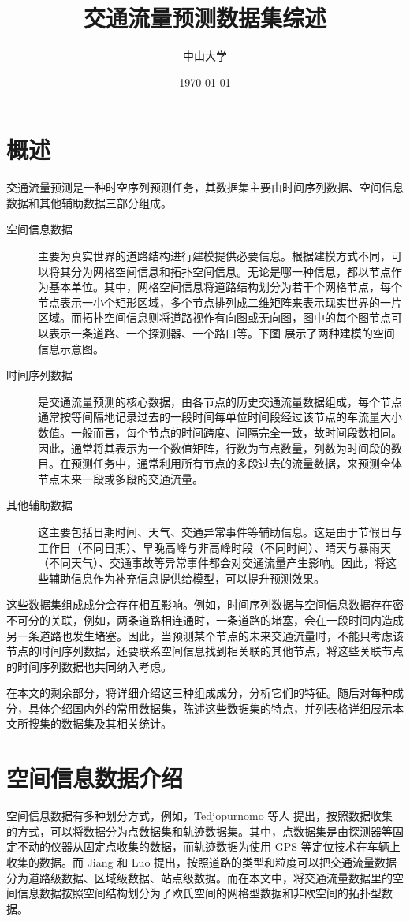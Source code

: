 \documentclass{ctexart}
\begin{document}
\title{交通流量预测数据集综述}
\author{中山大学}
\date{\today}
\maketitle
\tableofcontents
\section{概述}

交通流量预测是一种时空序列预测任务，其数据集主要由时间序列数据、空间信息数据和其他辅助数据三部分组成。

\begin{description}
    \item[空间信息数据] 主要为真实世界的道路结构进行建模提供必要信息。根据建模方式不同，可以将其分为网格空间信息和拓扑空间信息。无论是哪一种信息，都以节点作为基本单位。其中，网格空间信息将道路结构划分为若干个网格节点，每个节点表示一小个矩形区域，多个节点排列成二维矩阵来表示现实世界的一片区域。而拓扑空间信息则将道路视作有向图或无向图，图中的每个图节点可以表示一条道路、一个探测器、一个路口等。下图 展示了两种建模的空间信息示意图。
    \item[时间序列数据] 是交通流量预测的核心数据，由各节点的历史交通流量数据组成，每个节点通常按等间隔地记录过去的一段时间每单位时间段经过该节点的车流量大小数值。一般而言，每个节点的时间跨度、间隔完全一致，故时间段数相同。因此，通常将其表示为一个数值矩阵，行数为节点数量，列数为时间段的数目。在预测任务中，通常利用所有节点的多段过去的流量数据，来预测全体节点未来一段或多段的交通流量。
    \item[其他辅助数据] 这主要包括日期时间、天气、交通异常事件等辅助信息。这是由于节假日与工作日（不同日期）、早晚高峰与非高峰时段（不同时间）、晴天与暴雨天（不同天气）、交通事故等异常事件都会对交通流量产生影响。因此，将这些辅助信息作为补充信息提供给模型，可以提升预测效果。
\end{description}

这些数据集组成成分会存在相互影响。例如，时间序列数据与空间信息数据存在密不可分的关联，例如，两条道路相连通时，一条道路的堵塞，会在一段时间内造成另一条道路也发生堵塞。因此，当预测某个节点的未来交通流量时，不能只考虑该节点的时间序列数据，还要联系空间信息找到相关联的其他节点，将这些关联节点的时间序列数据也共同纳入考虑。

在本文的剩余部分，将详细介绍这三种组成成分，分析它们的特征。随后对每种成分，具体介绍国内外的常用数据集，陈述这些数据集的特点，并列表格详细展示本文所搜集的数据集及其相关统计。

\section{空间信息数据介绍}
空间信息数据有多种划分方式，例如，Tedjopurnomo 等人\cite{tedjopurnomo_survey_2022} 提出，按照数据收集的方式，可以将数据分为点数据集和轨迹数据集。其中，点数据集是由探测器等固定不动的仪器从固定点收集的数据，而轨迹数据为使用 GPS 等定位技术在车辆上收集的数据。而 Jiang 和 Luo\cite{jiang_graph_2023} 提出，按照道路的类型和粒度可以把交通流量数据分为道路级数据、区域级数据、站点级数据。而在本文中，将交通流量数据里的空间信息数据按照空间结构划分为了欧氏空间的网格型数据和非欧空间的拓扑型数据。
\end{document}
